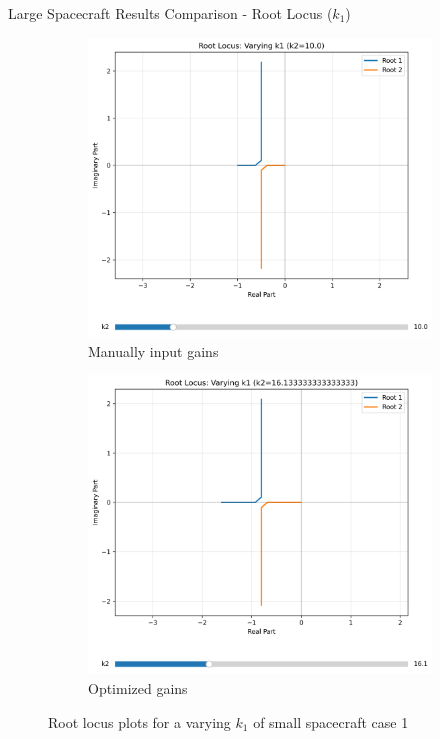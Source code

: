 \documentclass{beamer}
\begin{document}
\begin{frame}{Large Spacecraft Results Comparison - Root Locus ($k_1$)}
    \begin{figure}[H]
    \label{Fig. 1}
    \centering
    \begin{subfigure}[b]{0.48\columnwidth}
        \label{Fig. 1.A}
        \centering
        \includegraphics[width=\linewidth]{base_k1_root_locus(4).pdf}
        \caption{Manually input gains}
        \label{fig:subfig1}
    \end{subfigure}
    \hfill
    \begin{subfigure}[b]{0.48\columnwidth}
        \label{Fig. 1.B}
        \centering
        \includegraphics[width=\linewidth]{best_k1_root_locus(4).pdf}
        \caption{Optimized gains}
        \label{fig:subfig2}
    \end{subfigure}
    \caption{Root locus plots for a varying $k_1$ of small spacecraft case 1}
    \label{fig:combined}
\end{figure}
\end{frame}
\end{document}
